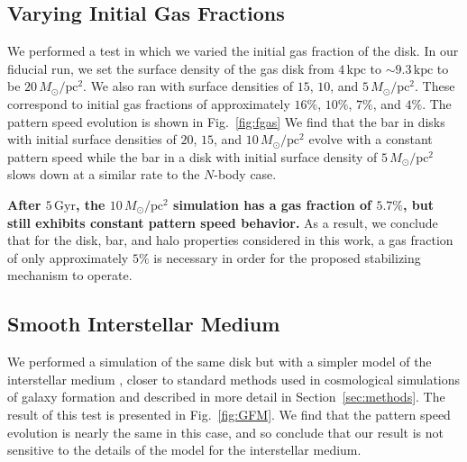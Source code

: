 \documentclass[twocolumn,linenumbers,trackchanges]{aastex631}
\newcommand{\Nbody}{$N$-body}
\newcommand{\Msun}{\ensuremath{M_{\odot}}}
\begin{document}
\subsection{Varying Initial Gas Fractions}
We performed a test in which we varied the initial gas fraction of the
disk. In our fiducial run, we set the surface density of the gas disk from
$4\,\textrm{kpc}$ to $\sim9.3\,\textrm{kpc}$ to be $20\,\Msun/\textrm{pc}^2$.
We also ran with surface densities of $15$, $10$, and
$5\,\Msun/\textrm{pc}^2$. These correspond to initial gas fractions of
approximately $16\%$, $10\%$, $7\%$, and $4\%$. The pattern speed evolution is
shown in Fig.~\ref{fig:fgas} We find that the bar in disks with
initial surface densities of $20$, $15$, and $10\,\Msun/\textrm{pc}^2$ evolve
with a constant pattern speed while the bar in a disk with initial surface
density of $5\,\Msun/\textrm{pc}^2$ slows down at a similar rate to the \Nbody{} case.

{\bf After $5\,\textrm{Gyr}$, the $10\,\Msun/\textrm{pc}^2$ simulation has a gas
fraction of $5.7\%$, but still exhibits constant pattern speed behavior.} As a
result, we conclude that for the disk, bar, and halo properties considered in
this work, a gas fraction of only approximately $5\%$ is necessary in order for
the proposed stabilizing mechanism to operate.



\subsection{Smooth Interstellar Medium}
We performed a simulation of the same disk but with a simpler model of the
interstellar medium \citep{2003MNRAS.339..289S}, closer to standard methods used
in cosmological simulations of galaxy formation and described in more detail in
Section~\ref{sec:methods}. The result of this test is presented in
Fig.~\ref{fig:GFM}. We find that the pattern speed evolution is nearly the same
in this case, and so conclude that our result is not sensitive to the details of
the model for the interstellar medium.
\end{document}
